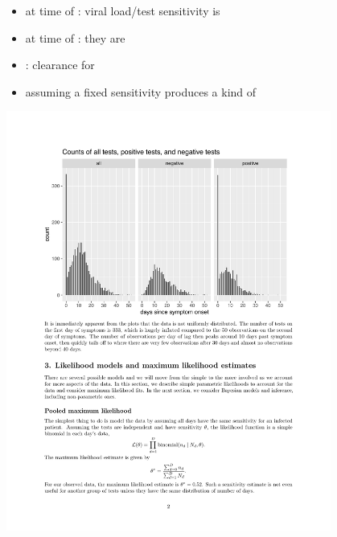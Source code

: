 \documentclass[9pt]{report}
\begin{document}
\begin{itemize}
\item at time of : viral load/test sensitivity is 
\item at time of : they are 
\item {}: clearance for 
  \vfill
\item assuming a fixed sensitivity produces a kind of 
\end{itemize}


\includegraphics[width=0.8\textwidth]{img/test-pos-neg-counts.pdf}

\end{document}
